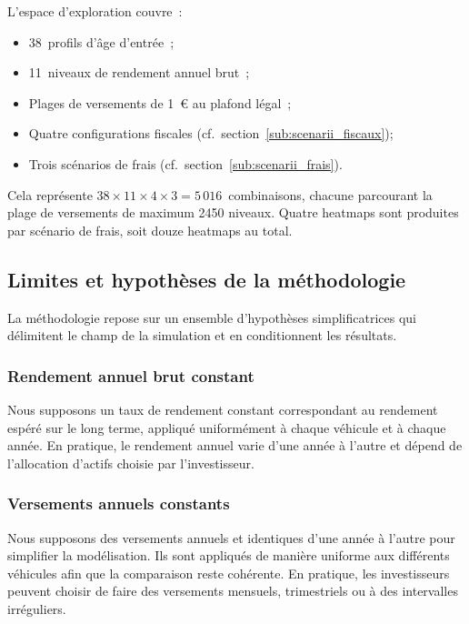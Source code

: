 ﻿\documentclass[12pt, a4paper]{article}
\begin{document}
L'espace d'exploration couvre~:
\begin{itemize}
  \item 38~profils d'âge d'entrée~;
  \item 11~niveaux de rendement annuel brut~;
  \item Plages de versements de 1~€ au plafond légal~;
  \item Quatre configurations fiscales (cf.~section~\ref{sub:scenarii_fiscaux});
  \item Trois scénarios de frais (cf.~section~\ref{sub:scenarii_frais}).
\end{itemize}

Cela représente $38 \times 11 \times 4 \times 3 = 5\,016$~combinaisons, chacune
parcourant la plage de versements de maximum 2450 niveaux.
Quatre heatmaps sont produites par scénario de frais,
soit douze heatmaps au total.

\subsection{Limites et hypothèses de la méthodologie}
\label{subsec:limites-methodo}

La méthodologie repose sur un ensemble d'hypothèses simplificatrices qui délimitent le
champ de la simulation et en conditionnent les résultats.

\subsubsection*{Rendement annuel brut constant}

Nous supposons un taux de rendement constant correspondant au rendement espéré sur le
long terme, appliqué uniformément à chaque véhicule et à chaque année. 
En pratique, le rendement annuel varie d'une année à l'autre
et dépend de l'allocation d'actifs choisie par l'investisseur.

\subsubsection*{Versements annuels constants}

Nous supposons des versements annuels et identiques d'une année à l'autre pour simplifier
la modélisation. Ils sont appliqués de manière uniforme aux différents
véhicules afin que la comparaison
reste cohérente. En pratique, les investisseurs peuvent choisir de faire des versements mensuels, 
trimestriels ou à des intervalles irréguliers.
\end{document}
